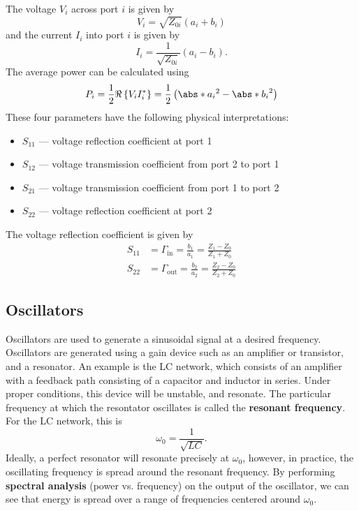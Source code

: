 \documentclass{article}
\begin{document}
The voltage \(V_i\) across port \(i\) is given by
\begin{equation*}
    V_i = \sqrt{Z_{0i}} \left( a_i + b_i \right)
\end{equation*}
and the current \(I_i\) into port \(i\) is given by
\begin{equation*}
    I_i = \frac{1}{\sqrt{Z_{0i}}} \left( a_i - b_i \right).
\end{equation*}
The average power can be calculated using
\begin{equation*}
    P_i = \frac{1}{2} \Re\left\{ V_i I_i^* \right\} = \frac{1}{2} \left( \abs*{a_i}^2 - \abs*{b_i}^2 \right)
\end{equation*}
These four parameters have the following physical interpretations:
\begin{itemize}
    \item \(S_{11}\) --- voltage reflection coefficient at port 1
    \item \(S_{12}\) --- voltage transmission coefficient from port 2 to port 1
    \item \(S_{21}\) --- voltage transmission coefficient from port 1 to port 2
    \item \(S_{22}\) --- voltage reflection coefficient at port 2
\end{itemize}
The voltage reflection coefficient is given by
\begin{align*}
    S_{11} & = \Gamma_{\mathrm{in}} = \frac{b_1}{a_1} = \frac{Z_1 - Z_0}{Z_1 + Z_0}  \\
    S_{22} & = \Gamma_{\mathrm{out}} = \frac{b_2}{a_2} = \frac{Z_2 - Z_0}{Z_2 + Z_0}
\end{align*}
\subsection{Oscillators}
Oscillators are used to generate a sinusoidal signal at a desired
frequency. Oscillators are generated using a gain device such as an
amplifier or transistor, and a resonator. An example is the LC network,
which consists of an amplifier with a feedback path consisting of a
capacitor and inductor in series. Under proper conditions, this device
will be unstable, and resonate. The particular frequency at which the
resontator oscillates is called the \textbf{resonant frequency}. For
the LC network, this is
\begin{equation*}
    \omega_0 = \frac{1}{\sqrt{LC}}.
\end{equation*}
Ideally, a perfect resonator will resonate precisely at \(\omega_0\),
however, in practice, the oscillating frequency is spread around the
resonant frequency. By performing \textbf{spectral analysis}
(power vs. frequency) on the output of the oscillator, we can see that
energy is spread over a range of frequencies centered around \(\omega_0\).
\end{document}
